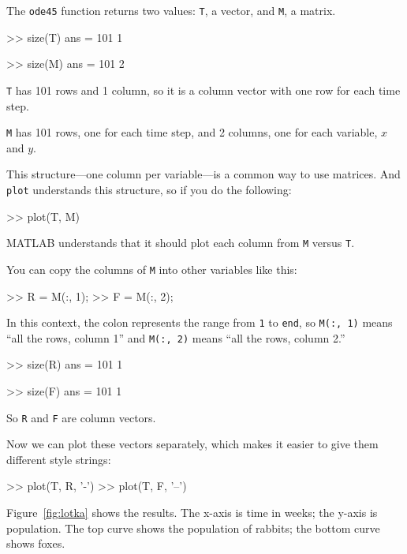 The \lstinline{ode45} function returns two values: \lstinline{T}, a vector,
and \lstinline{M}, a matrix.

\begin{code}
>> size(T)
ans = 101     1

>> size(M)
ans = 101     2
\end{code}

\lstinline{T} has 101 rows and 1 column, so it is a column vector with one row for
each time step.

\lstinline{M} has 101 rows, one for each time step, and 2 columns, one for each variable,
$x$ and $y$.

This structure---one column per variable---is a common way to
use matrices. And \lstinline{plot} understands this structure, so if you
do the following:

\begin{code}
>> plot(T, M)
\end{code}
MATLAB understands that it should plot each column from \lstinline{M}
versus \lstinline{T}.


You can copy the columns of \lstinline{M} into other variables like
this:

\begin{code}
>> R = M(:, 1);
>> F = M(:, 2);
\end{code}

In this context, the colon represents the range from \lstinline{1} to \lstinline{end},
so \lstinline{M(:, 1)} means ``all the rows, column 1'' and
\lstinline{M(:, 2)} means ``all the rows, column 2.''

\begin{code}
>> size(R)
ans = 101     1

>> size(F)
ans = 101     1
\end{code}

So \lstinline{R} and \lstinline{F} are column vectors.


Now we can plot these vectors separately, which makes it easier to give them different style strings:

\begin{code}
>> plot(T, R, '-')
>> plot(T, F, '--')
\end{code}


Figure~\ref{fig:lotka} shows the results. The x-axis is time in weeks; the y-axis is population.  The top curve shows the population of rabbits; the bottom curve shows foxes.

